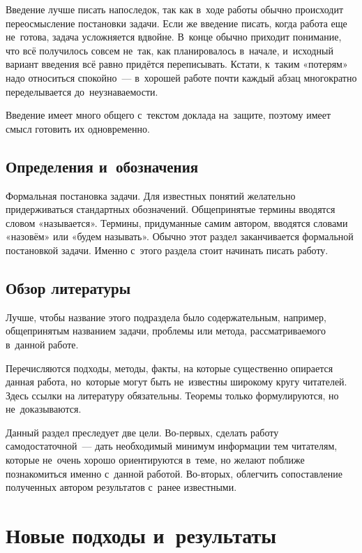 \documentclass[12pt,fleqn]{article}
\begin{document}
Введение лучше писать напоследок, так как в~ходе работы обычно происходит переосмысление постановки задачи.
Если же введение писать, когда работа еще не~готова, задача усложняется вдвойне.
В~конце обычно приходит понимание, что всё получилось совсем не~так, как планировалось в~начале,
и~исходный вариант введения всё равно придётся переписывать. 
Кстати, к~таким «потерям» надо относиться спокойно~--- в~хорошей работе почти каждый абзац многократно переделывается до~неузнаваемости.
 
Введение имеет много общего с~текстом доклада на~защите, поэтому имеет смысл готовить их одновременно.

\subsection{Определения и~обозначения}

Формальная постановка задачи. 
Для известных понятий желательно придерживаться стандартных обозначений. 
Общепринятые термины вводятся словом «называется». 
Термины, придуманные самим автором, вводятся словами «назовём» или «будем называть». 
Обычно этот раздел заканчивается формальной постановкой задачи.
Именно с~этого раздела стоит начинать писать работу.

\subsection{Обзор литературы}

Лучше, чтобы название этого подраздела было содержательным, 
например, общепринятым названием задачи, проблемы или метода,
рассматриваемого в~данной работе. 

Перечисляются подходы, методы, факты, на которые существенно опирается данная работа, 
но~которые могут быть не~известны широкому кругу читателей.
Здесь ссылки на литературу обязательны. 
Теоремы только формулируются, но не~доказываются.

Данный раздел преследует две цели. 
Во-первых, сделать работу самодостаточной~--- дать необходимый минимум информации тем читателям,
которые не~очень хорошо ориентируются в~теме, но желают поближе познакомиться именно с~данной работой.
Во-вторых, облегчить сопоставление полученных автором результатов с~ранее известными.

\section{Новые подходы и~результаты}
\end{document}
